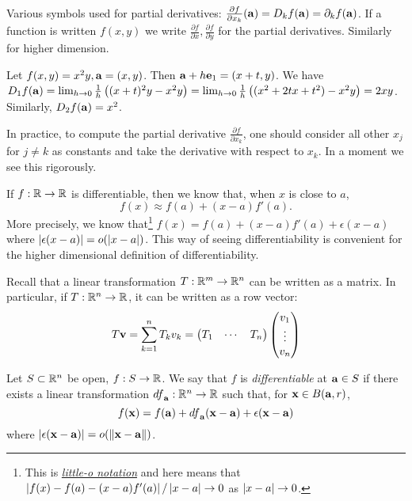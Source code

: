 \begin{remark*}
    Various symbols used for partial derivatives:
    \(\frac{\partial f}{\partial x_k}(\aa) = D_k f(\aa) = \partial_{k}f(\aa)\).
    If  a function is written \(f(x,y)\) we write \(\frac{\partial f}{\partial x}, \frac{\partial f}{\partial y}\) for the partial derivatives. Similarly for higher dimension.
\end{remark*}

\begin{example}
 Let $f(x,y) = x^2 y, \aa = (x,y)$. Then $\aa + h\ee_1 = (x+t, y)$.
 We have $D_{1}f(\aa) = \lim_{h\to 0} \frac{1}{h}\left((x+t)^2y - x^2y\right)
 = \lim_{h\to 0} \frac{1}{h}\left((x^2+2tx+t^2) - x^2y\right) = 2xy$.
 Similarly, $D_2 f(\aa) = x^2$.
\end{example}

In practice, to compute the partial derivative \( \frac{\partial f}{\partial x_k}\), one should consider all other \(x_j\) for \(j\neq k\) as constants and take the derivative with respect to \(x_k\).
In a moment we see this rigorously.


If \(f:\bR \to \bR\) is differentiable, then we know that, when \(x\) is close to \(a\),
\[
    f(x) \approx f(a) + (x-a) f'(a).
\]
More precisely, we know that\footnote{This is \href{https://en.wikipedia.org/wiki/Big_O_notation\#Little-o_notation}{\emph{little-o notation}} and here means that \(\abs{f(x) - f(a) - (x-a) f'(a)}/\abs{x-a} \to 0\) as \(\abs{x-a}\to 0\).  } \(f(x) = f(a) + (x-a) f'(a) + \epsilon(x-a)\) where \(\abs{\epsilon(x-a)} = \littleo{\abs{x-a}}\).
This way of seeing differentiability is convenient for the higher dimensional definition of differentiability.

Recall that a linear transformation $T : \bR^m \to \bR^n$ can be written as a matrix.
In particular, if $T: \bR^n \to \bR$, it can be written as a row vector:
\begin{align*}
 T\vv = \sum_{k=1}^n T_k v_k = \begin{pmatrix} T_1 & \cdots & T_n \end{pmatrix} \begin{pmatrix} v_1 \\ \vdots \\ v_n \end{pmatrix}
\end{align*}


\begin{definition}[differentiable]%
    \label{def:differentiable}
    Let \(S\subset \bR^n\) be open, \(f:S \to \bR\).
    We say that \(f\) is \emph{differentiable} at \(\aa \in S\) if there exists a linear transformation \({df}_{\aa}: \bR^n \to \bR\) such that, for \(\xx \in B(\aa,r)\),
    \[
        f(\xx) = f(\aa) + {df}_{\aa}(\xx-\aa) + \epsilon(\xx-\aa)
    \]
    where \(\abs{\epsilon(\xx-\aa)} = \littleo{\norm{\xx-\aa}}\).
\end{definition}


